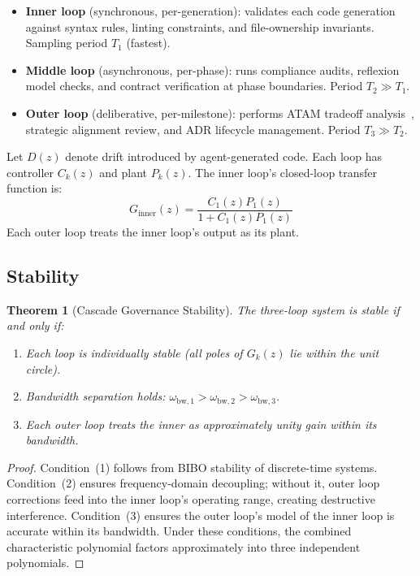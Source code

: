 \documentclass[11pt, a4paper, logo, copyright]{googledeepmind}
\newtheorem{theorem}{Theorem}[section]
\begin{document}
\begin{itemize}
    \item \textbf{Inner loop} (synchronous, per-generation): validates each code generation against syntax rules, linting constraints, and file-ownership invariants. Sampling period $T_1$ (fastest).
    \item \textbf{Middle loop} (asynchronous, per-phase): runs compliance audits, reflexion model checks, and contract verification at phase boundaries. Period $T_2 \gg T_1$.
    \item \textbf{Outer loop} (deliberative, per-milestone): performs ATAM tradeoff analysis~\citep{kazman2000}, strategic alignment review, and ADR lifecycle management. Period $T_3 \gg T_2$.
\end{itemize}

Let $D(z)$ denote drift introduced by agent-generated code. Each loop has controller $C_k(z)$ and plant $P_k(z)$. The inner loop's closed-loop transfer function is:
\begin{equation}
    G_{\mathrm{inner}}(z) = \frac{C_1(z) P_1(z)}{1 + C_1(z) P_1(z)}
\end{equation}
Each outer loop treats the inner loop's output as its plant.

\subsection{Stability}

\begin{theorem}[Cascade Governance Stability]
\label{thm:cascade}
The three-loop system is stable if and only if:
\begin{enumerate}
    \item Each loop is individually stable (all poles of $G_k(z)$ lie within the unit circle).
    \item Bandwidth separation holds: $\omega_{\mathrm{bw},1} > \omega_{\mathrm{bw},2} > \omega_{\mathrm{bw},3}$.
    \item Each outer loop treats the inner as approximately unity gain within its bandwidth.
\end{enumerate}
\end{theorem}

\begin{proof}
Condition~(1) follows from BIBO stability of discrete-time systems. Condition~(2) ensures frequency-domain decoupling; without it, outer loop corrections feed into the inner loop's operating range, creating destructive interference. Condition~(3) ensures the outer loop's model of the inner loop is accurate within its bandwidth. Under these conditions, the combined characteristic polynomial factors approximately into three independent polynomials.
\end{proof}
\end{document}

